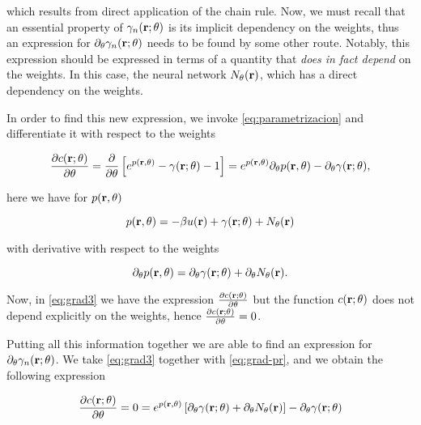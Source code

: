 which results from direct application of the chain rule. Now, we must recall that an
essential property of $\gamma_{n}(\mathbf{r}; \theta)$ is its implicit dependency on the
weights, thus an expression for $\partial_{\theta} \gamma_{n}(\mathbf{r}; \theta)$ needs to
be found by some other route. Notably, this expression should be expressed in terms
of a quantity that \emph{does in fact depend} on the weights. In this case, the neural
network $N_{\theta}(\mathbf{r})$, which has a direct dependency on the weights.

In order to find this new expression, we invoke \autoref{eq:parametrizacion} and
differentiate it with respect to the weights

\begin{equation}
    \frac{\partial c(\mathbf{r}; \theta)}{\partial \theta} = \frac{\partial}{\partial \theta}
    \left[ e^{p(\mathbf{r}, \theta)} - \gamma(\mathbf{r}; \theta) - 1 \right] =
    e^{p(\mathbf{r}, \theta)} \partial_{\theta} p(\mathbf{r}, \theta) - \partial_{\theta} \gamma(\mathbf{r}; \theta)
    ,
    \label{eq:grad3}
\end{equation}

here we have for $p(\mathbf{r}, \theta)$

\begin{equation}
    p(\mathbf{r}, \theta) = -\beta u(\mathbf{r}) + \gamma(\mathbf{r}; \theta) + N_{\theta}(\mathbf{r})
    \label{eq:pr}    
\end{equation}

with derivative with respect to the weights

\begin{equation}
    \partial_{\theta} p(\mathbf{r}, \theta) = \partial_{\theta} \gamma(\mathbf{r}; \theta) + \partial_{\theta} N_{\theta}(\mathbf{r})
    .
    \label{eq:grad-pr}
\end{equation}

Now, in \autoref{eq:grad3} we have the expression $\frac{\partial c(\mathbf{r}; \theta)}{\partial \theta}$
but the function $c(\mathbf{r}; \theta)$ does not depend explicitly on the weights, hence
$\frac{\partial c(\mathbf{r}; \theta)}{\partial \theta}=0$.

Putting all this information together we are able to find an expression for
$\partial_{\theta} \gamma_{n}(\mathbf{r}; \theta)$.
We take \autoref{eq:grad3} together with \autoref{eq:grad-pr}, and we obtain the following
expression

\begin{equation}
    \frac{\partial c(\mathbf{r}; \theta)}{\partial \theta} = 0 =
    e^{p(\mathbf{r}, \theta)} \left[ \partial_{\theta} \gamma(\mathbf{r}; \theta) + \partial_{\theta} N_{\theta}(\mathbf{r}) \right]
    - \partial_{\theta} \gamma(\mathbf{r}; \theta)
    \label{eq:grad4}
\end{equation}

